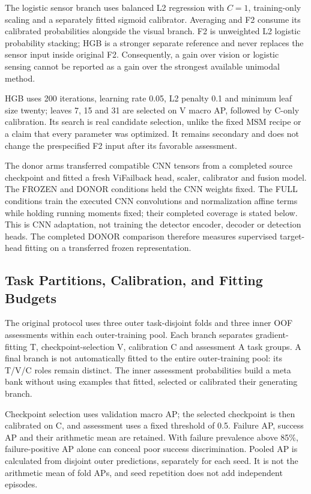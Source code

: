 The logistic sensor branch uses balanced L2 regression with $C=1$, training-only scaling
and a separately fitted sigmoid calibrator. Averaging and F2 consume its calibrated
probabilities alongside the visual branch. F2 is unweighted L2 logistic probability
stacking; HGB is a stronger separate reference and never replaces the sensor input
inside original F2. Consequently, a gain over vision or logistic sensing cannot be
reported as a gain over the strongest available unimodal method.

HGB uses 200 iterations, learning rate 0.05, L2 penalty 0.1 and minimum leaf size
twenty; leaves 7, 15 and 31 are selected on V macro AP, followed by C-only calibration.
Its search is real candidate selection, unlike the fixed MSM recipe or a claim that
every parameter was optimized. It remains secondary and does not change the prespecified
F2 input after its favorable assessment.


The donor arms transferred compatible CNN tensors from a completed source checkpoint and
fitted a fresh ViFailback head, scaler, calibrator and fusion model. The FROZEN and
DONOR conditions held the CNN weights fixed. The FULL conditions train the executed CNN
convolutions and normalization affine terms while holding running moments fixed; their
completed coverage is stated below. This is CNN adaptation, not training the detector
encoder, decoder or detection heads. The completed DONOR comparison therefore measures
supervised target-head fitting on a transferred frozen representation.

\subsection{Task Partitions, Calibration, and Fitting Budgets}
The original protocol uses three outer task-disjoint folds and three inner OOF
assessments within each outer-training pool. Each branch separates gradient-fitting T,
checkpoint-selection V, calibration C and assessment A task groups. A final branch is
not automatically fitted to the entire outer-training pool: its T/V/C roles remain
distinct. The inner assessment probabilities build a meta bank without using examples
that fitted, selected or calibrated their generating branch.

Checkpoint selection uses validation macro AP; the selected checkpoint is then
calibrated on C, and assessment uses a fixed threshold of 0.5. Failure AP, success AP
and their arithmetic mean are retained. With failure prevalence above 85\%,
failure-positive AP alone can conceal poor success discrimination. Pooled AP is
calculated from disjoint outer predictions, separately for each seed. It is not the
arithmetic mean of fold APs, and seed repetition does not add independent episodes.

